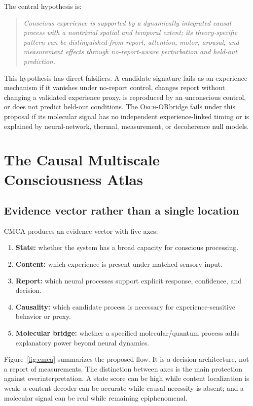 \documentclass[conference]{IEEEtran}
\newcommand{\ORCH}{\textsc{Orch-OR}}
\begin{document}
The central hypothesis is:
\begin{quote}
\emph{Conscious experience is supported by a dynamically integrated causal process with a nontrivial spatial and temporal extent; its theory-specific pattern can be distinguished from report, attention, motor, arousal, and measurement effects through no-report-aware perturbation and held-out prediction.}
\end{quote}

This hypothesis has direct falsifiers. A candidate signature fails as an experience mechanism if it vanishes under no-report control, changes report without changing a validated experience proxy, is reproduced by an unconscious control, or does not predict held-out conditions. The \ORCH bridge fails under this proposal if its molecular signal has no independent experience-linked timing or is explained by neural-network, thermal, measurement, or decoherence null models.

\section{The Causal Multiscale Consciousness Atlas}

\subsection{Evidence vector rather than a single location}

CMCA produces an evidence vector with five axes:
\begin{enumerate}
\item \textbf{State:} whether the system has a broad capacity for conscious processing.
\item \textbf{Content:} which experience is present under matched sensory input.
\item \textbf{Report:} which neural processes support explicit response, confidence, and decision.
\item \textbf{Causality:} which candidate process is necessary for experience-sensitive behavior or proxy.
\item \textbf{Molecular bridge:} whether a specified molecular/quantum process adds explanatory power beyond neural dynamics.
\end{enumerate}

Figure~\ref{fig:cmca} summarizes the proposed flow. It is a decision architecture, not a report of measurements. The distinction between axes is the main protection against overinterpretation. A state score can be high while content localization is weak; a content decoder can be accurate while causal necessity is absent; and a molecular signal can be real while remaining epiphenomenal.
\end{document}
